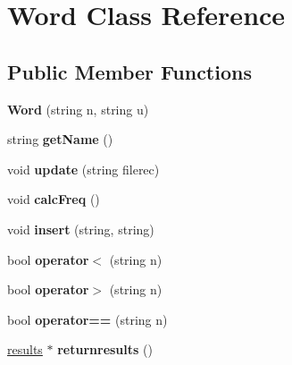 \hypertarget{classWord}{\section{Word Class Reference}
\label{classWord}
}
\subsection*{Public Member Functions}
\begin{DoxyCompactItemize}
\item 
\hypertarget{classWord_a07349887aa658557615ff68908a2dc92}{{\bfseries Word} (string n, string u)}\label{classWord_a07349887aa658557615ff68908a2dc92}

\item 
\hypertarget{classWord_a9aa81b5fdc966468ceef4bd52a57e3f6}{string {\bfseries get\-Name} ()}\label{classWord_a9aa81b5fdc966468ceef4bd52a57e3f6}

\item 
\hypertarget{classWord_a699c6b5fac01cd1aa3601a358759f6df}{void {\bfseries update} (string filerec)}\label{classWord_a699c6b5fac01cd1aa3601a358759f6df}

\item 
\hypertarget{classWord_a61e1cbffbb73c2f668795e6fc83c6d69}{void {\bfseries calc\-Freq} ()}\label{classWord_a61e1cbffbb73c2f668795e6fc83c6d69}

\item 
\hypertarget{classWord_a55076b057ee15c2c9320dd3668f57b2f}{void {\bfseries insert} (string, string)}\label{classWord_a55076b057ee15c2c9320dd3668f57b2f}

\item 
\hypertarget{classWord_aad769676afc9ff0149ebd0463d50b87e}{bool {\bfseries operator$<$} (string n)}\label{classWord_aad769676afc9ff0149ebd0463d50b87e}

\item 
\hypertarget{classWord_ad5ed9cfc7cc0f0483d10e4cf9fd2ab51}{bool {\bfseries operator$>$} (string n)}\label{classWord_ad5ed9cfc7cc0f0483d10e4cf9fd2ab51}

\item 
\hypertarget{classWord_aeeee177b7f4302a0a4ec3d087091e968}{bool {\bfseries operator==} (string n)}\label{classWord_aeeee177b7f4302a0a4ec3d087091e968}

\item 
\hypertarget{classWord_a6056f8c8e37d8fc3214391af2bc06e7e}{\hyperlink{classresults}{results} $\ast$ {\bfseries returnresults} ()}\label{classWord_a6056f8c8e37d8fc3214391af2bc06e7e}

\end{DoxyCompactItemize}
